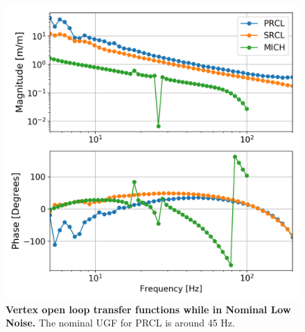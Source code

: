 	\begin{figure}[t!]
		\centering
		\includegraphics[width=0.75 \textwidth]{../Figures/MeasuredVertexOLF.png}
		\caption[Vertex open loop transfer functions while in Nominal Low Noise.]  
		{\textbf{Vertex open loop transfer functions while in Nominal Low Noise.}
			The nominal UGF for PRCL is around 45 Hz.
		}
		\label{fig:vertex_OLTF}
	\end{figure}
	
